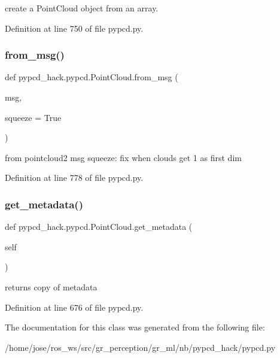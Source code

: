 \begin{DoxyVerb}create a PointCloud object from an array.
\end{DoxyVerb}
 

Definition at line 750 of file pypcd.\+py.

\mbox{\label{classpypcd__hack_1_1pypcd_1_1PointCloud_aaf05e57c1f81d5f519c45494283082a3}} 
\subsubsection{\texorpdfstring{from\+\_\+msg()}{from\_msg()}}
{\footnotesize\ttfamily def pypcd\+\_\+hack.\+pypcd.\+Point\+Cloud.\+from\+\_\+msg (\begin{DoxyParamCaption}\item[{}]{msg,  }\item[{}]{squeeze = {\ttfamily True} }\end{DoxyParamCaption})\hspace{0.3cm}{\ttfamily [static]}}

\begin{DoxyVerb}from pointcloud2 msg
squeeze: fix when clouds get 1 as first dim
\end{DoxyVerb}
 

Definition at line 778 of file pypcd.\+py.

\mbox{\label{classpypcd__hack_1_1pypcd_1_1PointCloud_a58c7a76fe2b5fb28c2cce4f518b4198a}} 
\subsubsection{\texorpdfstring{get\+\_\+metadata()}{get\_metadata()}}
{\footnotesize\ttfamily def pypcd\+\_\+hack.\+pypcd.\+Point\+Cloud.\+get\+\_\+metadata (\begin{DoxyParamCaption}\item[{}]{self }\end{DoxyParamCaption})}

\begin{DoxyVerb}returns copy of metadata \end{DoxyVerb}
 

Definition at line 676 of file pypcd.\+py.



The documentation for this class was generated from the following file\+:\begin{DoxyCompactItemize}
\item 
/home/jose/ros\+\_\+ws/src/gr\+\_\+perception/gr\+\_\+ml/nb/pypcd\+\_\+hack/pypcd.\+py\end{DoxyCompactItemize}
